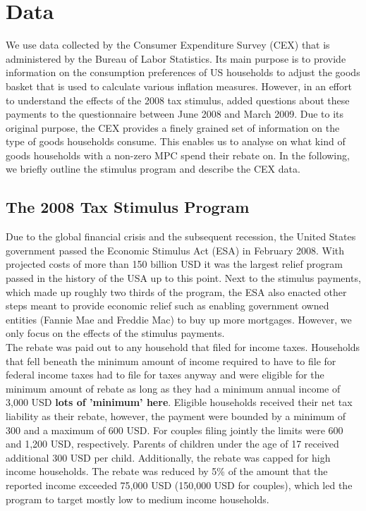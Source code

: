 \newpage
\section{Data} \label{sec:data}
We use data collected by the Consumer Expenditure Survey (CEX) that is administered by the Bureau of Labor Statistics. Its main purpose is to provide information on the consumption preferences of US households to adjust the goods basket that is used to calculate various inflation measures. However, in an effort to understand the effects of the 2008 tax stimulus, \cite{parker_etal_13} added questions about these payments to the questionnaire between June 2008 and March 2009.  Due to its original purpose, the CEX provides a finely grained set of information on the type of goods households consume. This enables us to analyse on what kind of goods households with a non-zero MPC spend their rebate on. In the following, we briefly outline the stimulus program and describe the CEX data. 

\subsection{The 2008 Tax Stimulus Program} 
Due to the global financial crisis and the subsequent recession, the United States government passed the Economic Stimulus Act (ESA) in February 2008. With projected costs of more than 150 billion USD it was the largest relief program passed in the history of the USA up to this point. Next to the stimulus payments, which made up roughly two thirds of the program, the ESA also enacted other steps meant to provide economic relief such as enabling government owned entities (Fannie Mae and Freddie Mac) to buy up more mortgages. However, we only focus on the effects of the stimulus payments. \\
The rebate was paid out to any household that filed for income taxes. Households that fell beneath the minimum amount of income required to have to file for federal income taxes had to file for taxes anyway and were eligible for the minimum amount of rebate as long as they had a minimum annual income of 3,000 USD \textbf{lots of 'minimum' here}. Eligible households received their net tax liability as their rebate, however, the payment were bounded by a minimum of 300 and a maximum of 600 USD. For couples filing jointly the limits were 600 and 1,200 USD, respectively. Parents of children under the age of 17 received additional 300 USD per child. Additionally, the rebate was capped for high income households. The rebate was reduced by 5\% of the amount that the reported income exceeded 75,000 USD (150,000 USD for couples), which led the program to target mostly low to medium income households.

